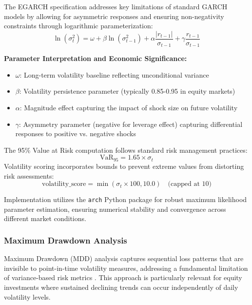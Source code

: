 \documentclass[3p,times,procedia]{elsarticle}
\begin{document}
The EGARCH specification addresses key limitations of standard GARCH models by allowing for asymmetric responses and ensuring non-negativity constraints through logarithmic parameterization:
\vspace{-0.4cm}
\begin{equation}
\ln(\sigma_t^2) = \omega + \beta \ln(\sigma_{t-1}^2) + \alpha \frac{|r_{t-1}|}{\sigma_{t-1}} + \gamma \frac{r_{t-1}}{\sigma_{t-1}}
\end{equation}

\textbf{Parameter Interpretation and Economic Significance:}
\begin{itemize}
    \item $\omega$: Long-term volatility baseline reflecting unconditional variance
    \item $\beta$: Volatility persistence parameter (typically 0.85-0.95 in equity markets) \cite{Bollerslev1986}
    \item $\alpha$: Magnitude effect capturing the impact of shock size on future volatility
    \item $\gamma$: Asymmetry parameter (negative for leverage effect) capturing differential responses to positive vs. negative shocks \cite{Black1976}
\end{itemize}

The 95\% Value at Risk computation follows standard risk management practices:
\vspace{-0.4cm}
\begin{equation}
\text{VaR}_{95} = 1.65 \times \sigma_t
\end{equation}
Volatility scoring incorporates bounds to prevent extreme values from distorting risk assessments:
\vspace{-0.4cm}
\begin{equation}
\text{volatility\_score} = \min(\sigma_t \times 100, 10.0) \quad \text{(capped at 10)}
\end{equation}

Implementation utilizes the \texttt{arch} Python package \cite{Sheppard2020} for robust maximum likelihood parameter estimation, ensuring numerical stability and convergence across different market conditions.

\subsubsection{{Maximum Drawdown Analysis}}

Maximum Drawdown (MDD) analysis captures sequential loss patterns that are invisible to point-in-time volatility measures, addressing a fundamental limitation of variance-based risk metrics \cite{Jorion2001}. This approach is particularly relevant for equity investments where sustained declining trends can occur independently of daily volatility levels.
\end{document}

